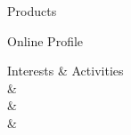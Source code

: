 \documentclass[a4paper,12pt]{article}
\begin{document}
\begin{resumeblock}{Products}

\newline
\largeskip
\end{resumeblock}

\begin{resumeblock}{Online Profile}

\newline
\largeskip

\end{resumeblock}


\begin{interestsblock}{Interests \& Activities}
    \\
	 &
	\\
	&\\
	 &
\end{interestsblock}
\end{document}
